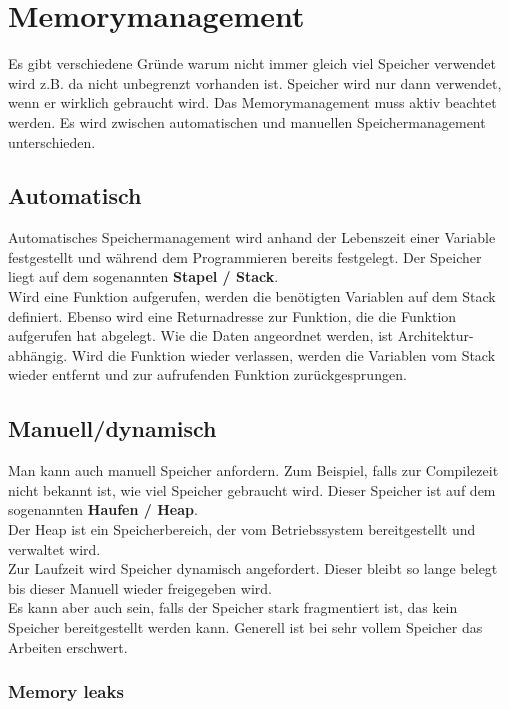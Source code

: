\section{Memorymanagement}

Es gibt verschiedene Gründe warum nicht immer gleich viel Speicher verwendet wird z.B. da nicht unbegrenzt vorhanden ist.
Speicher wird nur dann verwendet, wenn er wirklich gebraucht wird. 
Das Memorymanagement muss aktiv beachtet werden.
Es wird zwischen automatischen und manuellen Speichermanagement unterschieden. 

\subsection{Automatisch}

Automatisches Speichermanagement wird anhand der Lebenszeit einer Variable festgestellt und während dem Programmieren bereits festgelegt. 
Der Speicher liegt auf dem sogenannten \textbf{Stapel / Stack}.\\
Wird eine Funktion aufgerufen, werden die benötigten Variablen auf dem Stack definiert. 
Ebenso wird eine Returnadresse zur Funktion, die die Funktion aufgerufen hat abgelegt.
Wie die Daten angeordnet werden, ist Architektur-abhängig.
Wird die Funktion wieder verlassen, werden die Variablen vom Stack wieder entfernt und zur aufrufenden Funktion zurückgesprungen.  

\subsection{Manuell/dynamisch}

Man kann auch manuell Speicher anfordern. 
Zum Beispiel, falls zur Compilezeit nicht bekannt ist, wie viel Speicher gebraucht wird.
Dieser Speicher ist auf dem sogenannten \textbf{Haufen / Heap}.\\
Der Heap ist ein Speicherbereich, der vom Betriebssystem bereitgestellt und verwaltet wird.\\
Zur Laufzeit wird Speicher dynamisch angefordert. 
Dieser bleibt so lange belegt bis dieser Manuell wieder freigegeben wird.\\
Es kann aber auch sein, falls der Speicher stark fragmentiert ist, das kein Speicher bereitgestellt werden kann. 
Generell ist bei sehr vollem Speicher das Arbeiten erschwert.

\subsubsection{Memory leaks}

